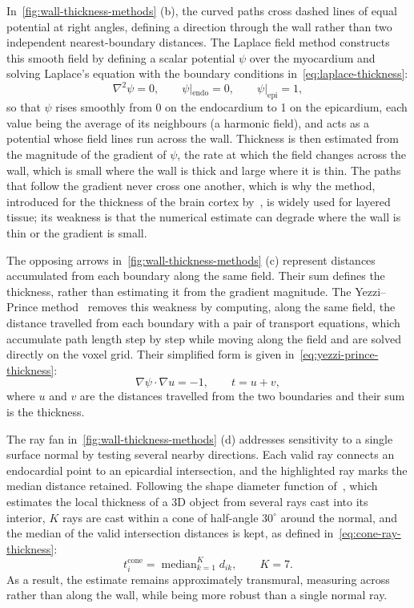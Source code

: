 In~\cref{fig:wall-thickness-methods} (b), the curved paths cross dashed lines
of equal potential at right angles, defining a direction through the wall
rather than two independent nearest-boundary distances. The Laplace field
method constructs this smooth field by defining a scalar potential $\psi$
over the myocardium and solving Laplace's
equation with the boundary conditions in~\cref{eq:laplace-thickness}:
\begin{equation}
	\nabla^2 \psi = 0,
	\qquad
	\psi|_{\mathrm{endo}} = 0,
	\qquad
	\psi|_{\mathrm{epi}} = 1,
	\label{eq:laplace-thickness}
\end{equation}
so that $\psi$ rises smoothly from 0 on the endocardium to 1 on the
epicardium, each value being the average of its neighbours (a harmonic
field), and acts as a potential whose field lines run across the wall.
Thickness is then estimated from the magnitude of
the gradient of $\psi$, the rate at which the field changes across the wall,
which is small where the wall is thick and large where it is thin. The paths
that follow the gradient never cross one another, which is why the method,
introduced for the thickness of the brain cortex by~\textcite{jones2000laplace},
is widely used for layered tissue; its weakness is that the numerical estimate
can degrade where the wall is thin or the gradient is small.

The opposing arrows in~\cref{fig:wall-thickness-methods} (c) represent
distances accumulated from each boundary along the same field. Their sum
defines the thickness, rather than estimating it from the gradient magnitude.
The Yezzi--Prince
method~\parencite{yezzi2003thickness} removes this weakness by computing,
along the same field, the distance travelled from each boundary with a pair of
transport equations, which accumulate path length step by step while moving
along the field and are solved directly on the voxel grid. Their simplified form is given in~\cref{eq:yezzi-prince-thickness}:
\begin{equation}
	\nabla \psi \cdot \nabla u = -1,
	\qquad
	t = u + v,
	\label{eq:yezzi-prince-thickness}
\end{equation}
where $u$ and $v$ are the distances travelled from the two boundaries and
their sum is the thickness.

The ray fan in~\cref{fig:wall-thickness-methods} (d) addresses sensitivity to
a single surface normal by testing several nearby directions. Each valid ray
connects an endocardial point to an epicardial intersection, and the
highlighted ray marks the median distance retained. Following the shape
diameter function of~\textcite{shapira2008sdf}, which estimates the local
thickness of a 3D object from several rays cast into its interior, $K$
rays are cast within a cone of half-angle $30^{\circ}$ around the normal, and
the median of the valid intersection distances is kept, as defined in~\cref{eq:cone-ray-thickness}:
\begin{equation}
	t_i^{\mathrm{cone}} = \operatorname{median}_{k=1}^{K} d_{ik},
	\qquad K=7.
	\label{eq:cone-ray-thickness}
\end{equation}
As a result, the estimate remains approximately transmural, measuring across rather than
along the wall, while being more robust than a single normal ray.


